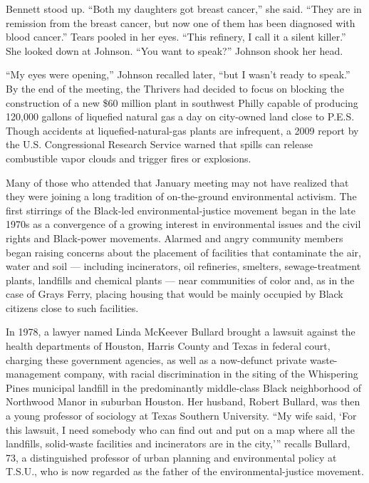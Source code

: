 Bennett stood up. ``Both my daughters got breast cancer,'' she said.
``They are in remission from the breast cancer, but now one of them has
been diagnosed with blood cancer.'' Tears pooled in her eyes. ``This
refinery, I call it a silent killer.'' She looked down at Johnson. ``You
want to speak?'' Johnson shook her head.

``My eyes were opening,'' Johnson recalled later, ``but I wasn't ready
to speak.'' By the end of the meeting, the Thrivers had decided to focus
on blocking the construction of a new \$60 million plant in southwest
Philly capable of producing 120,000 gallons of liquefied natural gas a
day on city-owned land close to P.E.S. Though accidents at
liquefied-natural-gas plants are infrequent, a 2009 report by the U.S.
Congressional Research Service warned that spills can release
combustible vapor clouds and trigger fires or explosions.

Many of those who attended that January meeting may not have realized
that they were joining a long tradition of on-the-ground environmental
activism. The first stirrings of the Black-led environmental-justice
movement began in the late 1970s as a convergence of a growing interest
in environmental issues and the civil rights and Black-power movements.
Alarmed and angry community members began raising concerns about the
placement of facilities that contaminate the air, water and soil ---
including incinerators, oil refineries, smelters, sewage-treatment
plants, landfills and chemical plants --- near communities of color and,
as in the case of Grays Ferry, placing housing that would be mainly
occupied by Black citizens close to such facilities.

In 1978, a lawyer named Linda McKeever Bullard brought a lawsuit against
the health departments of Houston, Harris County and Texas in federal
court, charging these government agencies, as well as a now-defunct
private waste-management company, with racial discrimination in the
siting of the Whispering Pines municipal landfill in the predominantly
middle-class Black neighborhood of Northwood Manor in suburban Houston.
Her husband, Robert Bullard, was then a young professor of sociology at
Texas Southern University. ``My wife said, `For this lawsuit, I need
somebody who can find out and put on a map where all the landfills,
solid-waste facilities and incinerators are in the city,''' recalls
Bullard, 73, a distinguished professor of urban planning and
environmental policy at T.S.U., who is now regarded as the father of the
environmental-justice movement.

